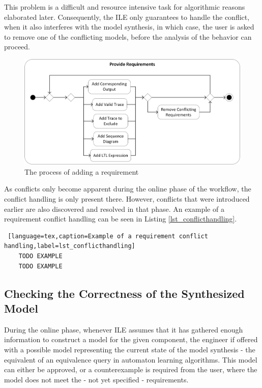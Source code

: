 This problem is a difficult and resource intensive task for algorithmic reasons elaborated later. Consequently, the ILE only guarantees to handle the conflict, when it also interferes with the model synthesis, in which case, the user is asked to remove one of the conflicting models, before the analysis of the behavior can proceed.

\begin{figure}[!ht] 
	\centering
		\includegraphics[width=130mm, keepaspectratio]{figures/methodology_providerequirementsworkflow.png}
	\caption{The process of adding a requirement}
	\label{fig_providerequirementsworkflow}
\end{figure}


As conflicts only become apparent during the online phase of the workflow, the conflict handling is only present there. However, conflicts that were introduced earlier are also discovered and resolved in that phase. An example of a requirement conflict handling can be seen in Listing \ref{lst_conflicthandling}.

\bigskip
\begin{minipage}{\linewidth}
\begin{lstlisting} [language=tex,caption=Example of a requirement conflict handling,label=lst_conflicthandling]
	TODO EXAMPLE
	TODO EXAMPLE
\end{lstlisting}%
\end{minipage}

\subsection{Checking the Correctness of the Synthesized Model} \label{subs_eq}
During the online phase, whenever ILE assumes that it has gathered enough information to construct a model for the given component, the engineer if offered with a possible model representing the current state of the model synthesis - the equivalent of an equivalence query in automaton learning algorithms. This model can either be approved, or a counterexample is required from the user, where the model does not meet the - not yet specified - requirements.

